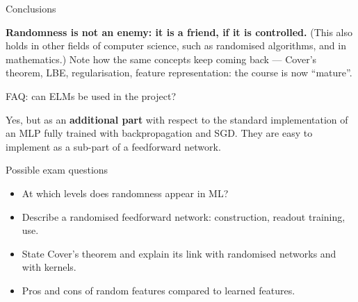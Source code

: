 \begin{boxabstract}{Conclusions}

\textbf{Randomness is not an enemy: it is a friend, if it is
controlled.} (This also holds in other fields of computer science, such
as randomised algorithms, and in mathematics.) Note how the same
concepts keep coming back --- Cover's theorem, LBE, regularisation,
feature representation: the course is now ``mature''.

\end{boxabstract}

\begin{boxnote}{FAQ: can ELMs be used in the project?}

Yes, but as an \textbf{additional part} with respect to the standard
implementation of an MLP fully trained with backpropagation and SGD.
They are easy to implement as a sub-part of a feedforward network.

\end{boxnote}

\begin{boxquestion}{Possible exam questions}

\begin{itemize}
\tightlist
\item
  At which levels does randomness appear in ML?
\item
  Describe a randomised feedforward network: construction, readout
  training, use.
\item
  State Cover's theorem and explain its link with randomised networks
  and with kernels.
\item
  Pros and cons of random features compared to learned features.
\end{itemize}

\end{boxquestion}
